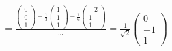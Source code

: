 \begin{loesung}
\begin{align*}
&=
\frac{
\begin{pmatrix}0\\0\\1\end{pmatrix}
-\frac13\begin{pmatrix}1\\1\\1\end{pmatrix}
-\frac16\begin{pmatrix}-2\\1\\1\end{pmatrix}}{\dots}
=
\frac1{\sqrt{2}}\begin{pmatrix}0\\-1\\1\end{pmatrix}
\end{align*}
\end{loesung}


